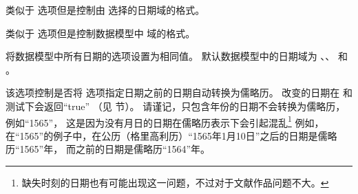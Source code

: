 \begin{optionlist}
类似于  选项但是控制由  选择的日期域的格式。


类似于  选项但是控制数据模型中  域的格式。


将数据模型中所有日期的选项设置为相同值。
默认数据模型中的日期域为 、、 和 。



该选项控制是否将  选项指定日期之前的日期自动转换为儒略历。
改变的日期在  和  测试下会返回“true”
（见  节）。
请谨记，只包含年份的日期不会转换为儒略历，例如“1565”，
这是因为没有月日的日期在儒略历表示下会引起混乱\footnote{
	缺失时刻的日期也有可能出现这一问题，不过对于文献作品问题不大。}
例如，在“1565”的例子中，在公历（格里高利历）“1565年1月10日”之后的日期是儒略历“1565”年，
而之前的日期是儒略历“1564”年。



\end{optionlist}
